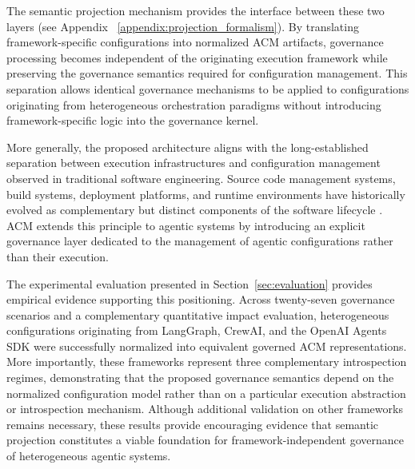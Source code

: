 \documentclass[10pt]{article}
\begin{document}
The semantic projection mechanism provides the interface between these two layers (see Appendix ~\ref{appendix:projection_formalism}). By translating framework-specific configurations into normalized ACM artifacts, governance processing becomes independent of the originating execution framework while preserving the governance semantics required for configuration management. This separation allows identical governance mechanisms to be applied to configurations originating from heterogeneous orchestration paradigms without introducing framework-specific logic into the governance kernel.

More generally, the proposed architecture aligns with the long-established separation between execution infrastructures and configuration management observed in traditional software engineering. Source code management systems, build systems, deployment platforms, and runtime environments have historically evolved as complementary but distinct components of the software lifecycle \cite{ref25}. ACM extends this principle to agentic systems by introducing an explicit governance layer dedicated to the management of agentic configurations rather than their execution.

The experimental evaluation presented in Section~\ref{sec:evaluation} provides empirical evidence supporting this positioning. Across twenty-seven governance scenarios and a complementary quantitative impact evaluation, heterogeneous configurations originating from LangGraph, CrewAI, and the OpenAI Agents SDK were successfully normalized into equivalent governed ACM representations. More importantly, these frameworks represent three complementary introspection regimes, demonstrating that the proposed governance semantics depend on the normalized configuration model rather than on a particular execution abstraction or introspection mechanism. Although additional validation on other frameworks remains necessary, these results provide encouraging evidence that semantic projection constitutes a viable foundation for framework-independent governance of heterogeneous agentic systems.
\end{document}
